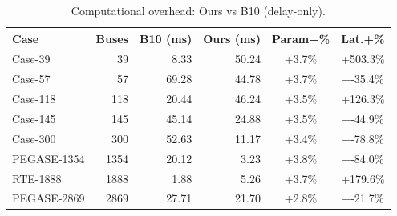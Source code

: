 \begin{table}[t]
\centering
\caption{Computational overhead: Ours vs B10 (delay-only).}
\label{tab:scalability}
\begin{tabular}{lrrrcc}
\toprule
Case & Buses & B10 (ms) & Ours (ms) & Param+\% & Lat.+\% \\
\midrule
Case-39 & 39 & 8.33 & 50.24 & +3.7\% & +503.3\% \\
Case-57 & 57 & 69.28 & 44.78 & +3.7\% & +-35.4\% \\
Case-118 & 118 & 20.44 & 46.24 & +3.5\% & +126.3\% \\
Case-145 & 145 & 45.14 & 24.88 & +3.5\% & +-44.9\% \\
Case-300 & 300 & 52.63 & 11.17 & +3.4\% & +-78.8\% \\
PEGASE-1354 & 1354 & 20.12 & 3.23 & +3.8\% & +-84.0\% \\
RTE-1888 & 1888 & 1.88 & 5.26 & +3.7\% & +179.6\% \\
PEGASE-2869 & 2869 & 27.71 & 21.70 & +2.8\% & +-21.7\% \\
\bottomrule
\end{tabular}
\end{table}